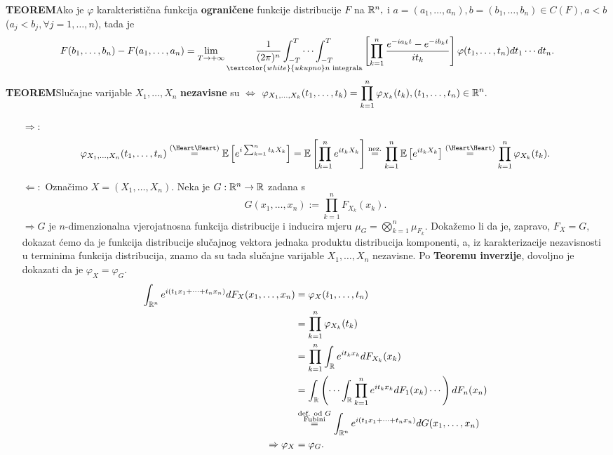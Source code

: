 \documentclass{article}
\begin{document}
\textbf{TEOREM}\newline Ako je \(\varphi\) karakteristična funkcija \textbf{ograničene} funkcije distribucije \(F\) na \(\Bbb R^n,\) i \newline \(a=(a_1,\ldots,a_n),b=(b_1,\ldots,b_n)\in C(F), a<b\)(\(a_j<b_j,\forall j=1,\ldots,n\)), tada je \[F(b_1,\ldots,b_n)-F(a_1,\ldots,a_n)=\lim_{T\to+\infty}\underset{\textcolor{white}{ukupno}n\text{ integrala}}{\frac1{(2\pi)^n}\int_{-T}^T\cdots\int_{-T}^T}\left[\prod_{k=1}^n\frac{e^{-ia_kt}-e^{-ib_kt}}{it_k}\right]\varphi(t_1,\ldots,t_n)dt_1\cdots dt_n.\] 
\textbf{TEOREM}\newline Slučajne varijable \(X_1,\ldots,X_n\) \textbf{nezavisne} su \(\Leftrightarrow\) \(\displaystyle\varphi_{X_1,\ldots,X_k}(t_1,\ldots,t_k)=\prod_{k=1}^n\varphi_{X_k}(t_k),(t_1,\ldots,t_n)\in\Bbb R^n.\)\newline\newline
\begin{itemize}
    \item[\(\boxed{\Rightarrow}:\)] \[\varphi_{X_1,\ldots,X_n}(t_1,\ldots,t_n)\overset{\text{(\Heart\Heart)}}{=}\Bbb E\left[e^{i\sum_{k=1}^nt_kX_k}\right]=\Bbb E\left[\prod_{k=1}^ne^{it_kX_k}\right]\overset{\text{nez.}}{=}\prod_{k=1}^n\Bbb E\left[e^{it_kX_k}\right]\overset{\text{(\Heart\Heart)}}{=}\prod_{k=1}^n\varphi_{X_k}(t_k).\] 
    \item[\(\boxed{\Leftarrow}:\)] Označimo \(X=(X_1,\ldots,X_n).\) Neka je \(G:\Bbb R^n\to\Bbb R\) zadana s \[G(x_1,\ldots,x_n):=\prod_{k=1}^nF_{X_k}(x_k).\] \(\Rightarrow G\) je \(n\)-dimenzionalna vjerojatnosna funkcija distribucije i inducira mjeru \(\mu_G=\bigotimes_{k=1}^n\mu_{F_k}.\) Dokažemo li da je, zapravo, \(F_X=G,\) dokazat ćemo da je funkcija distribucije slučajnog vektora jednaka produktu distribucija komponenti, a, iz karakterizacije nezavisnosti u terminima funkcija distribucija, znamo da su tada slučajne varijable \(X_1,\ldots,X_n\) nezavisne. Po \textbf{Teoremu inverzije}, dovoljno je dokazati da je \(\varphi_X=\varphi_G.\) \[\begin{aligned}\int_{\Bbb R^n}e^{i(t_1x_1+\cdots+t_nx_n)}dF_X(x_1,\ldots,x_n)&=\varphi_X(t_1,\ldots,t_n)\\&=\prod_{k=1}^n\varphi_{X_k}(t_k)\\&=\prod_{k=1}^n\int_{\Bbb R}e^{it_kx_k}dF_{X_k}(x_k)\\&=\int_{\Bbb R}\left(\cdots\int_{\Bbb R}\prod_{k=1}^ne^{it_kx_k}dF_1(x_k)\cdots\right)dF_n(x_n)\\&\overset{\substack{\text{def. od }G\\\text{Fubini}}}{=}\int_{\Bbb R^n}e^{i(t_1x_1+\cdots+t_nx_n)}dG(x_1,\ldots,x_n)\\\Rightarrow\varphi_X&=\varphi_G.\end{aligned}\] 
\end{itemize}
\newpage
\end{document}
